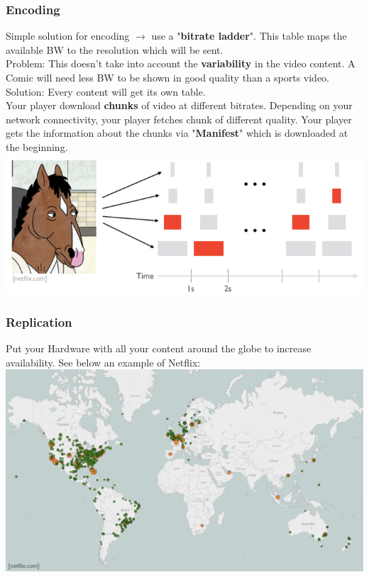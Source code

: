 \documentclass[a4paper, fontsize=8pt, landscape, DIV=1]{scrartcl}
\begin{document}
\begin{multicols*}{4}
		\subsubsection{Encoding}
		Simple solution for encoding $\rightarrow$ use a "\textbf{bitrate ladder}". This table maps the available BW to the resolution which will be sent.\\
		Problem: This doesn't take into account the \textbf{variability} in the video content. A Comic will need less BW to be shown in good quality than a sports video. \\
		Solution: Every content will get its own table. \\
		Your player download \textbf{chunks} of video at different bitrates. Depending on your network connectivity, your player fetches chunk of different quality. Your player gets the information about the chunks via "\textbf{Manifest}" which is downloaded at the beginning.\\
		\includegraphics[width=\columnwidth]{images/Application_Layer/encoding_chunks.png}
		
		\subsubsection{Replication}
		Put your Hardware with all your content around the globe to increase availability. See below an example of Netflix:\\ 
		\includegraphics[width=\columnwidth]{images/Application_Layer/netflix_recreation.png}
		

\end{multicols*}
\end{document}
